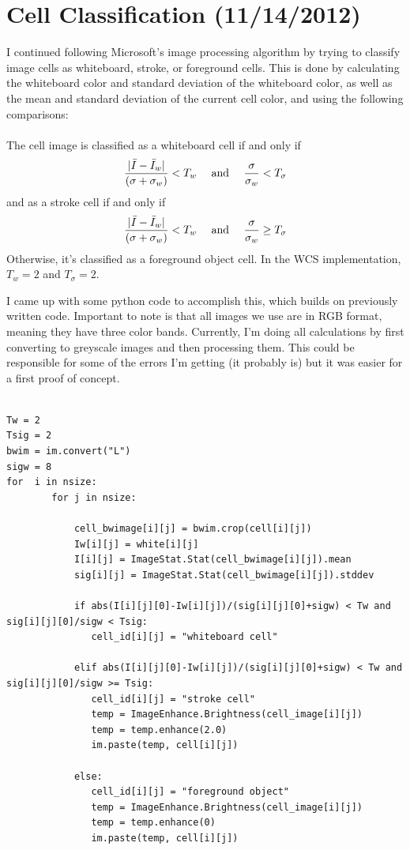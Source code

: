 \documentclass[]{article}
\begin{document}
	\section{Cell Classification (11/14/2012)}
		I continued following Microsoft's image processing algorithm by trying to classify image cells as whiteboard, stroke, or foreground cells.  This is done by calculating the whiteboard color and standard deviation of the whiteboard color, as well as the mean and standard deviation of the current cell color, and using the following comparisons: \\ \\
	 The cell image is classified as a whiteboard cell if and only if \[ {|\bar{I} - \bar{I}_w| \over (\sigma + \sigma_w)}<T_w \quad \textrm{ and } \quad  {\sigma \over \sigma_w }< T_\sigma \] 
and as a stroke cell if and only if
\[{|\bar{I}-\bar{I}_w| \over (\sigma + \sigma_w)}<T_w \quad \textrm{ and } \quad {\sigma \over \sigma_w} \geq T_\sigma \] 
Otherwise, it's classified as a foreground object cell.  In the WCS implementation, $T_w=2$ and $T_\sigma=2$.	

I came up with some python code to accomplish this, which builds on previously written code.  Important to note is that all images we use are in RGB format, meaning they have three color bands.  Currently, I'm doing all calculations by first converting to greyscale images and then processing them.  This could be responsible for some of the errors I'm getting (it probably is) but it was easier for a first proof of concept.  

\begin{verbatim}

Tw = 2
Tsig = 2
bwim = im.convert("L")
sigw = 8
for  i in nsize:
        for j in nsize:
           
            cell_bwimage[i][j] = bwim.crop(cell[i][j])
            Iw[i][j] = white[i][j]            
            I[i][j] = ImageStat.Stat(cell_bwimage[i][j]).mean
            sig[i][j] = ImageStat.Stat(cell_bwimage[i][j]).stddev
          
            if abs(I[i][j][0]-Iw[i][j])/(sig[i][j][0]+sigw) < Tw and sig[i][j][0]/sigw < Tsig:
               cell_id[i][j] = "whiteboard cell"

            elif abs(I[i][j][0]-Iw[i][j])/(sig[i][j][0]+sigw) < Tw and sig[i][j][0]/sigw >= Tsig:
               cell_id[i][j] = "stroke cell"
               temp = ImageEnhance.Brightness(cell_image[i][j])
               temp = temp.enhance(2.0)
               im.paste(temp, cell[i][j])

            else:
               cell_id[i][j] = "foreground object"
               temp = ImageEnhance.Brightness(cell_image[i][j])
               temp = temp.enhance(0)
               im.paste(temp, cell[i][j])
\end{verbatim}
\end{document}
